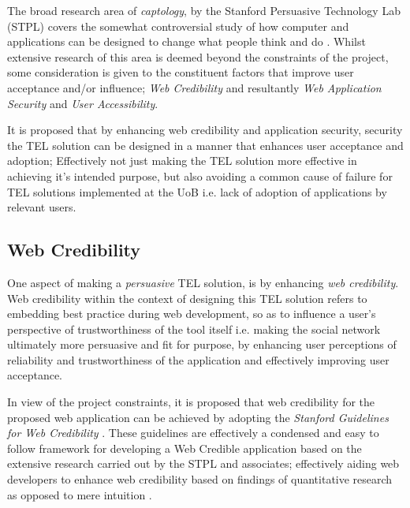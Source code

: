 The broad research area of \textit{captology}, by the Stanford Persuasive Technology Lab (STPL) covers the somewhat controversial study of  how computer and applications can be designed to change what people think and do \cite{Fogg2002a,Fogg2002,Fogg2001,Fogg1999}. Whilst extensive research of this area is deemed beyond the constraints of the project, some consideration is given to the constituent factors that improve user acceptance and/or influence; \textit{Web Credibility} and resultantly \textit{Web Application Security} and \textit{User Accessibility}.

It is proposed that by enhancing web credibility and application security, security the TEL solution can be designed in a manner that enhances user acceptance and adoption; Effectively not just making the TEL solution more effective in achieving it's intended purpose, but also avoiding a common cause of failure for TEL solutions implemented at the UoB i.e. lack of adoption of applications by relevant users.








\subsection{Web Credibility}

One aspect of making a \textit{persuasive} TEL solution, is by enhancing \textit{web credibility}. Web credibility within the context of designing this TEL solution refers to embedding best practice during web development, so as to influence a user's perspective of trustworthiness of the tool itself \cite{Fogg2001,Fogg2002} i.e. making the social network ultimately more persuasive and fit for purpose, by enhancing user perceptions of reliability and trustworthiness of the application \cite{Fogg2001} and effectively improving user acceptance.


In view of the project constraints, it is proposed that web credibility for the proposed web application can be achieved by adopting  the \textit{Stanford Guidelines for Web Credibility} \cite{Fogg2002a}. These guidelines are effectively a condensed and easy to follow framework for developing a Web Credible application based on the extensive research carried out by the STPL and associates; effectively aiding web developers to enhance web credibility based on findings of quantitative research as opposed to mere intuition \cite{Fogg2002a,Fogg2002,Fogg1999}.


